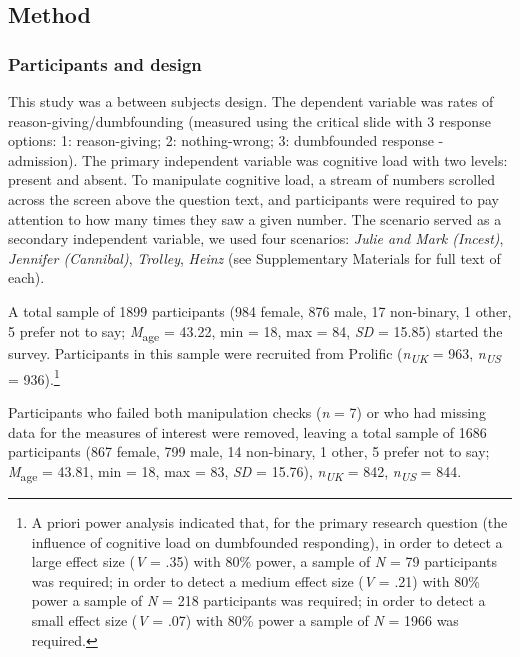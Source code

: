 \documentclass[
  american,
  man,floatsintext]{apa7}
\begin{document}
\hypertarget{method}{%
\subsection{Method}\label{method}}

\hypertarget{participants-and-design}{%
\subsubsection{Participants and design}\label{participants-and-design}}

This study was a between subjects design. The dependent variable was rates of reason-giving/dumbfounding (measured using the critical slide with 3 response options: 1: reason-giving; 2: nothing-wrong; 3: dumbfounded response - admission). The primary independent variable was cognitive load with two levels: present and absent. To manipulate cognitive load, a stream of numbers scrolled across the screen above the question text, and participants were required to pay attention to how many times they saw a given number. The scenario served as a secondary independent variable, we used four scenarios: \emph{Julie and Mark (Incest)}, \emph{Jennifer (Cannibal)}, \emph{Trolley}, \emph{Heinz} (see Supplementary Materials for full text of each).

A total sample of 1899 participants (984 female, 876 male, 17 non-binary, 1 other, 5 prefer not to say; \emph{M}\textsubscript{age} = 43.22, min = 18, max = 84, \emph{SD} = 15.85) started the survey. Participants in this sample were recruited from Prolific (\emph{n\textsubscript{UK}} = 963, \emph{n\textsubscript{US}} = 936).\footnote{A priori power analysis indicated that, for the primary research question (the influence of cognitive load on dumbfounded responding), in order to detect a large effect size (\emph{V} = .35) with 80\% power, a sample of \emph{N} = 79 participants was required; in order to detect a medium effect size (\emph{V} = .21) with 80\% power a sample of \emph{N} = 218 participants was required; in order to detect a small effect size (\emph{V} = .07) with 80\% power a sample of \emph{N} = 1966 was required.}

Participants who failed both manipulation checks (\emph{n} = 7) or who had missing data for the measures of interest were removed, leaving a total sample of 1686 participants (867 female, 799 male, 14 non-binary, 1 other, 5 prefer not to say; \emph{M}\textsubscript{age} = 43.81, min = 18, max = 83, \emph{SD} = 15.76), \emph{n\textsubscript{UK}} = 842, \emph{n\textsubscript{US}} = 844.
\end{document}
